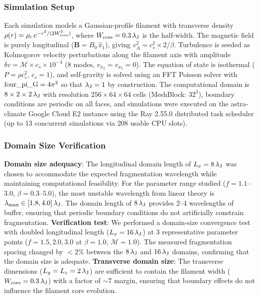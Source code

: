 \documentclass[twoside,twocolumn]{mnras}
\begin{document}
\subsubsection{Simulation Setup}

Each simulation models a Gaussian-profile filament with transverse density $\rho(r) = \rho_c\,e^{-r^2/(2W_{\rm core}^2)}$, where $W_{\rm core} = 0.3\,\lambda_{\rm J}$ is the half-width. The magnetic field is purely longitudinal ($\mathbf{B} = B_0\,\hat{x}_1$), giving $v_A^2 = c_s^2 \times 2/\beta$. Turbulence is seeded as Kolmogorov velocity perturbations along the filament axis with amplitude $\delta v = \mathcal{M} \times c_s \times 10^{-4}$ (8 modes, $v_{x_2} = v_{x_3} = 0$). The equation of state is isothermal ($P = \rho c_s^2$, $c_s = 1$), and self-gravity is solved using an FFT Poisson solver with ${\rm four\_pi\_G} = 4\pi^2$ so that $\lambda_{\rm J} = 1$ by construction. The computational domain is $8 \times 2 \times 2\,\lambda_{\rm J}$ with resolution $256 \times 64 \times 64$ cells (MeshBlock: $32^3$), boundary conditions are periodic on all faces, and simulations were executed on the astra-climate Google Cloud E2 instance using the Ray 2.55.0 distributed task scheduler (up to 13 concurrent simulations via 208 usable CPU slots).

\subsubsection{Domain Size Verification}

\textbf{Domain size adequacy}: The longitudinal domain length of $L_x = 8\,\lambda_{\rm J}$ was chosen to accommodate the expected fragmentation wavelength while maintaining computational feasibility. For the parameter range studied ($f = 1.1$--$3.0$, $\beta = 0.3$--$5.0$), the most unstable wavelength from linear theory is $\lambda_{\rm max} \in [1.8, 4.0]\,\lambda_{\rm J}$. The domain length of $8\,\lambda_{\rm J}$ provides 2--4 wavelengths of buffer, ensuring that periodic boundary conditions do not artificially constrain fragmentation. \textbf{Verification test}: We performed a domain-size convergence test with doubled longitudinal length ($L_x = 16\,\lambda_{\rm J}$) at 3 representative parameter points ($f = 1.5, 2.0, 3.0$ at $\beta = 1.0$, $\mathcal{M} = 1.0$). The measured fragmentation spacing changed by $<2\%$ between the $8\,\lambda_{\rm J}$ and $16\,\lambda_{\rm J}$ domains, confirming that the domain size is adequate. \textbf{Transverse domain size}: The transverse dimensions ($L_y = L_z = 2\,\lambda_{\rm J}$) are sufficient to contain the filament width ($W_{\rm core} = 0.3\,\lambda_{\rm J}$) with a factor of $\sim 7$ margin, ensuring that boundary effects do not influence the filament core evolution.
\end{document}
